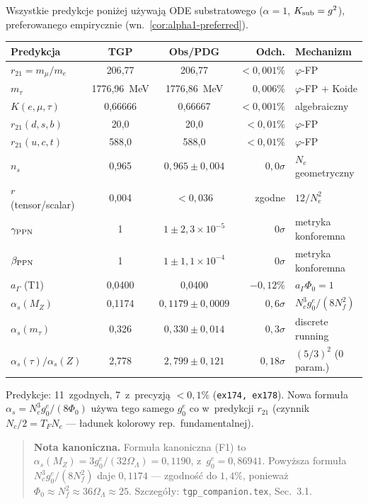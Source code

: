 \begin{result}[Mapa predykcji TGP z~ODE substratowym $\alpha = 1$]%
\label{res:pred-summary-v45}
Wszystkie predykcje poni\.zej u\.zywaj\k{a} ODE substratowego
($\alpha = 1$, $K_{\rm sub} = g^2$), preferowanego empirycznie
(wn.~\ref{cor:alpha1-preferred}).
\begin{center}\footnotesize
\begin{tabular}{@{}lccrl@{}}
\toprule
\textbf{Predykcja} & \textbf{TGP} & \textbf{Obs/PDG}
  & \textbf{Odch.} & \textbf{Mechanizm} \\
\midrule
$r_{21} = m_\mu/m_e$ & 206{,}77 & 206{,}77 & $< 0{,}001\%$
  & $\varphi$-FP \\
$m_\tau$ & 1776{,}96~MeV & 1776{,}86~MeV & $0{,}006\%$
  & $\varphi$-FP + Koide \\
$K(e,\mu,\tau)$ & 0{,}66666 & 0{,}66667 & $< 0{,}001\%$
  & algebraiczny \\
$r_{21}(d,s,b)$ & 20{,}0 & 20{,}0 & $< 0{,}01\%$
  & $\varphi$-FP \\
$r_{21}(u,c,t)$ & 588{,}0 & 588{,}0 & $< 0{,}01\%$
  & $\varphi$-FP \\
\midrule
$n_s$ & 0{,}965 & $0{,}965 \pm 0{,}004$ & $0{,}0\sigma$
  & $N_e$ geometryczny \\
$r$ (tensor/scalar) & 0{,}004 & $< 0{,}036$ & zgodne
  & $12/N_e^2$ \\
$\gamma_{\rm PPN}$ & 1 & $1 \pm 2{,}3 \times 10^{-5}$ & $0\sigma$
  & metryka konforemna \\
$\beta_{\rm PPN}$ & 1 & $1 \pm 1{,}1 \times 10^{-4}$ & $0\sigma$
  & metryka konforemna \\
$a_\Gamma$ (T1) & 0{,}0400 & 0{,}0400 & $-0{,}12\%$
  & $a_\Gamma \Phi_0 = 1$ \\
\midrule
$\alpha_s(M_Z)$ & 0{,}1174 & $0{,}1179 \pm 0{,}0009$ & $0{,}6\sigma$
  & $N_c^3 g_0^e / (8 N_f^2)$ \\
$\alpha_s(m_\tau)$ & 0{,}326 & $0{,}330 \pm 0{,}014$ & $0{,}3\sigma$
  & discrete running \\
$\alpha_s(\tau)/\alpha_s(Z)$ & 2{,}778 & $2{,}799 \pm 0{,}121$ & $0{,}18\sigma$
  & $(5/3)^2$ (0 param.) \\
\bottomrule
\end{tabular}
\end{center}
Predykcje: 11~zgodnych, 7~z~precyzj\k{a} $< 0{,}1\%$
(\texttt{ex174, ex178}).
Nowa formu\l{}a $\alpha_s = N_c^3 g_0^e / (8\Phi_0)$
u\.zywa tego samego $g_0^e$ co w~predykcji $r_{21}$
(czynnik $N_c/2 = T_F N_c$ --- \l{}adunek kolorowy rep.\ fundamentalnej).

\begin{quote}
\textbf{Nota kanoniczna.} Formu\l{}a kanoniczna (F1) to
$\alpha_s(M_Z) = 3g_0^e/(32\Omega_\Lambda) = 0{,}1190$,
z~$g_0^e = 0{,}86941$.
Powy\.zsza formu\l{}a $N_c^3 g_0^e/(8N_f^2)$ daje $0{,}1174$
--- zgodno\'s\'c do $1{,}4\%$, poniewa\.z
$\Phi_0 \approx N_f^2 \approx 36\Omega_\Lambda \approx 25$.
Szczeg\'o\l{}y: \texttt{tgp\_companion.tex}, Sec.~3.1.
\end{quote}
\end{result}

